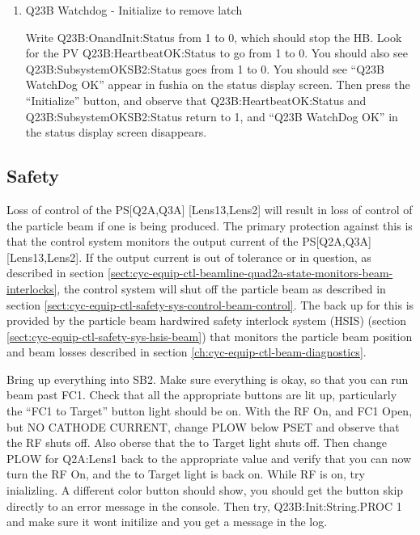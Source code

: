 \documentclass[11pt]{book}		%
\begin{document}
\begin{enumerate}
 \item Q23B Watchdog - Initialize to remove latch

\color{red}
Write Q23B:OnandInit:Status from 1 to 0, which should stop the HB. Look for the PV Q23B:HeartbeatOK:Status to go from 1 to 0. You should also see Q23B:SubsystemOKSB2:Status goes from 1 to 0. You should see ``Q23B WatchDog OK'' appear in fushia on the status display screen. Then press the ``Initialize'' button, and observe that Q23B:HeartbeatOK:Status and Q23B:SubsystemOKSB2:Status return to 1, and ``Q23B WatchDog OK'' in the status display screen disappears.
\color{black}

\end{enumerate}


\subsection{Safety}\label{sect:cyc-equip-ctl-beamline-sm23a-safety}

Loss of control of the PS[Q2A,Q3A] [Lens13,Lens2] will result in loss of control of the particle beam if one is being produced.  The primary protection against this is that the control system monitors the output current of the PS[Q2A,Q3A] [Lens13,Lens2].  If the output current is out of tolerance or in question, as described in section \ref{sect:cyc-equip-ctl-beamline-quad2a-state-monitors-beam-interlocks}, the control system will shut off the particle beam as described in section \ref{sect:cyc-equip-ctl-safety-sys-control-beam-control}.  The back up for this is provided by the particle beam hardwired safety interlock system (HSIS) (section \ref{sect:cyc-equip-ctl-safety-sys-hsis-beam}) that monitors the particle beam position and beam losses described in section \ref{ch:cyc-equip-ctl-beam-diagnostics}.


\color{red}

Bring up everything into SB2. Make sure everything is okay, so that you can run beam past FC1. Check that all the appropriate buttons are lit up, particularly the ``FC1 to Target'' button light should be on. With the RF On, and FC1 Open, but NO CATHODE CURRENT, change PLOW below PSET and observe that the RF shuts off. Also oberse that the to Target light shuts off. Then change PLOW for Q2A:Lens1 back to the appropriate value and verify that you can now turn the RF On, and the to Target light is back on. While RF is on, try inializling. A different color button should show, you should get the button skip directly to an error message in the console. Then try, Q23B:Init:String.PROC 1 and make sure it wont initilize and you get a message in the log.
\end{document}
